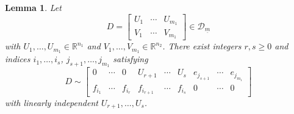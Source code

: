 \documentclass[pdftex]{sigma}
\numberwithin{equation}{section}
\newtheorem{Lemma}[Theorem]{Lemma}
\theoremstyle{definition}
\newcommand{\R}{\mathbb{R}}
\newcommand{\D}{\mathcal{D}}
\theoremstyle{plain}
\theoremstyle{plain}
\theoremstyle{plain}
\theoremstyle{plain}
\begin{document}
\begin{Lemma}{\label{lemme thm B}}
	Let
	\begin{equation*}
		D = \begin{bmatrix}
		U_{1} & \cdots & U_{m_1} \\
		V_{1} & \cdots & V_{m_1}
	\end{bmatrix} \in \D_{\underline m}
	\end{equation*}
	with $U_{1},\dots,U_{m_1} \in \R^{n_1}$ and $V_{1},\dots,V_{m_1} \in \R^{n_2}$.
	There exist integers $r,s \geqslant 0$ and indices $i_1,\dots,i_s$, $j_{s+1},\dots,j_{m_1}$ satisfying
	\begin{equation*}
		D \sim \begin{bmatrix}
		0 & \cdots & 0 & U_{r+1} & \cdots & U_{s} & e_{j_{s+1}} & \cdots & e_{j_{m_1}} \\
		f_{i_1} & \cdots & f_{i_r} & f_{i_{r+1}} & \cdots & f_{i_s} & 0 & \cdots & 0
	\end{bmatrix}
	\end{equation*}
	with linearly independent $U_{r+1},\dots,U_s$.
\end{Lemma}
\end{document}
